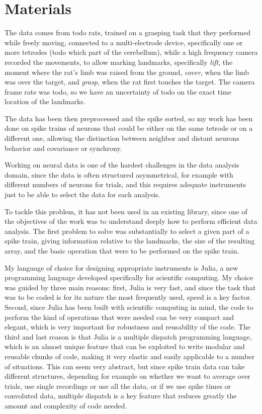 \section{Materials}

The data comes from todo rats, trained on a grasping task that they performed while freely moving, connected to a multi-electrode device, specifically one or more tetrodes (todo which part of the cerebellum), while a high frequency camera recorded the movements, to allow marking landmarks, specifically \emph{lift}, the moment where the rat's limb was raised from the ground, \emph{cover}, when the limb was over the target, and \emph{grasp}, when the rat first touches the target. The camera frame rate was todo, so we have an uncertainty of todo on the exact time location of the landmarks.

The data has been then preprocessed and the spike sorted, so my work has been done on spike trains of neurons that could be either on the same tetrode or on a different one, allowing the distinction between neighbor and distant neurons behavior and covariance or synchrony.


Working on neural data is one of the hardest challenges in the data analysis domain, since the data is often structured asymmetrical, for example with different numbers of neurons for trials, and this requires adequate instruments just to be able to select the data for each analysis.

To tackle this problem, it has not been used in an existing library, since one of the objectives of the work was to understand deeply how to perform efficient data analysis. 
The first problem to solve was substantially to select a given part of a spike train, giving information relative to the landmarks, the size of the resulting array, and the basic operation that were to be performed on the spike train.

My language of choice for designing appropriate instruments is Julia, a new programming language developed specifically for scientific computing. My choice was guided by three main reasons: first, Julia is very fast, and since the task that was to be coded is for its nature the most frequently used, speed is a key factor. Second, since Julia has been built with scientific computing in mind, the code to perform the kind of operations that were needed can be very compact and elegant, which is very important for robustness and reusability of the code. The third and last reason is that Julia is a multiple dispatch programming language, which is an almost unique feature that can be exploited to write modular and reusable chunks of code, making it very elastic and easily applicable to a number of situations. This can seem very abstract, but since spike train data can take different structures, depending for example on whether we want to average over trials, use single recordings or use all the data, or if we use spike times or convoluted data, multiple dispatch is a key feature that reduces greatly the amount and complexity of code needed.

